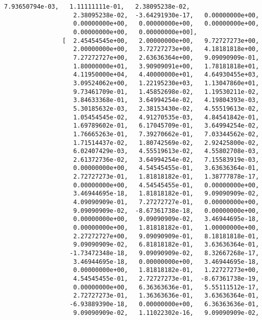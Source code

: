 \documentclass[11pt]{article}
\begin{document}
\begin{Verbatim}[commandchars=\\\{\}]
                   7.93650794e-03,   1.11111111e-01,   2.38095238e-02,
                   2.38095238e-02,  -3.64291930e-17,   0.00000000e+00,
                   0.00000000e+00,   0.00000000e+00,   0.00000000e+00,
                   0.00000000e+00,   0.00000000e+00],
                [  2.45454545e+00,   2.00000000e+00,   9.72727273e+00,
                   2.00000000e+00,   3.72727273e+00,   4.18181818e+00,
                   7.27272727e+00,   2.63636364e+00,   9.09090909e-01,
                   1.80000000e+01,   3.90909091e+00,   1.78181818e+01,
                   4.11950000e+04,   4.40000000e+01,   4.64930455e+03,
                   3.09524062e+00,   1.22195230e+03,   1.13047860e+01,
                   9.73461709e-01,   1.45852698e-02,   1.19530211e-02,
                   3.84633368e-01,   3.64994254e-02,   4.19804393e-03,
                   5.30185632e-03,   2.38153430e-02,   4.55519613e-02,
                   1.05454545e-02,   4.91270535e-03,   4.84541842e-01,
                   1.69789602e-01,   6.17045709e-01,   3.64994254e-02,
                   1.76665263e-01,   7.39270662e-01,   7.03344562e-02,
                   1.71514437e-02,   1.80742569e-02,   2.92425800e-02,
                   6.02407429e-03,   4.55519613e-02,   4.55802708e-03,
                   2.61372736e-02,   3.64994254e-02,   7.15583919e-03,
                   0.00000000e+00,   4.54545455e-01,   3.63636364e-01,
                   2.72727273e-01,   1.81818182e-01,   1.38777878e-17,
                   0.00000000e+00,   4.54545455e-01,   0.00000000e+00,
                   3.46944695e-18,   1.81818182e-01,   9.09090909e-02,
                   4.09090909e-01,   7.27272727e-01,   0.00000000e+00,
                   9.09090909e-02,  -8.67361738e-18,   0.00000000e+00,
                   0.00000000e+00,   9.09090909e-02,   3.46944695e-18,
                   0.00000000e+00,   1.81818182e-01,   1.00000000e+00,
                   2.27272727e+00,   9.09090909e-01,   8.18181818e-01,
                   9.09090909e-02,   6.81818182e-01,   3.63636364e-01,
                  -1.73472348e-18,   9.09090909e-02,   8.32667268e-17,
                   3.46944695e-18,   0.00000000e+00,   3.46944695e-18,
                   0.00000000e+00,   1.81818182e-01,   1.22727273e+00,
                   4.54545455e-01,   2.72727273e-01,  -8.67361738e-19,
                   0.00000000e+00,   6.36363636e-01,   5.55111512e-17,
                   2.72727273e-01,   1.36363636e-01,   3.63636364e-01,
                  -6.93889390e-18,   0.00000000e+00,   6.36363636e-01,
                   9.09090909e-02,   1.11022302e-16,   9.09090909e-02,

\end{Verbatim}
\end{document}
